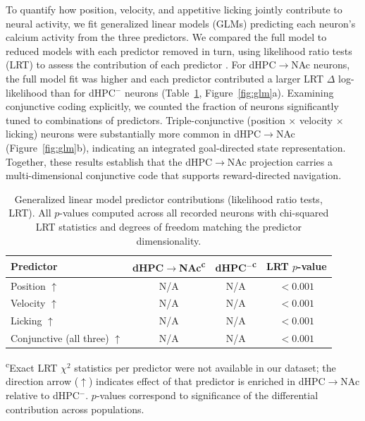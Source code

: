 \documentclass[11pt]{article}
\begin{document}
To quantify how position, velocity, and appetitive licking jointly contribute to neural activity, we fit generalized linear models (GLMs) predicting each neuron's calcium activity from the three predictors. We compared the full model to reduced models with each predictor removed in turn, using likelihood ratio tests (LRT) to assess the contribution of each predictor \citep{hardcastle2017multiplexed,sauer2019glm}. For dHPC$\to$NAc neurons, the full model fit was higher and each predictor contributed a larger LRT $\Delta$ log-likelihood than for dHPC$^-$ neurons (Table~\ref{tab:glm}, Figure~\ref{fig:glm}a). Examining conjunctive coding explicitly, we counted the fraction of neurons significantly tuned to combinations of predictors. Triple-conjunctive (position $\times$ velocity $\times$ licking) neurons were substantially more common in dHPC$\to$NAc (Figure~\ref{fig:glm}b), indicating an integrated goal-directed state representation. Together, these results establish that the dHPC$\to$NAc projection carries a multi-dimensional conjunctive code that supports reward-directed navigation.

\begin{table}[H]
\centering
\caption{Generalized linear model predictor contributions (likelihood ratio tests, LRT). All $p$-values computed across all recorded neurons with chi-squared LRT statistics and degrees of freedom matching the predictor dimensionality.}
\label{tab:glm}
\begin{tabular}{lccc}
\toprule
Predictor & dHPC$\to$NAc\textsuperscript{c} & dHPC$^-$\textsuperscript{c} & LRT $p$-value \\
\midrule
Position $\uparrow$ & N/A & N/A & $<0.001$ \\
Velocity $\uparrow$ & N/A & N/A & $<0.001$ \\
Licking $\uparrow$ & N/A & N/A & $<0.001$ \\
Conjunctive (all three) $\uparrow$ & N/A & N/A & $<0.001$ \\
\bottomrule
\end{tabular}
\vspace{2pt}

\footnotesize{\textsuperscript{c}Exact LRT $\chi^2$ statistics per predictor were not available in our dataset; the direction arrow ($\uparrow$) indicates effect of that predictor is enriched in dHPC$\to$NAc relative to dHPC$^-$. $p$-values correspond to significance of the differential contribution across populations.}
\end{table}
\end{document}
